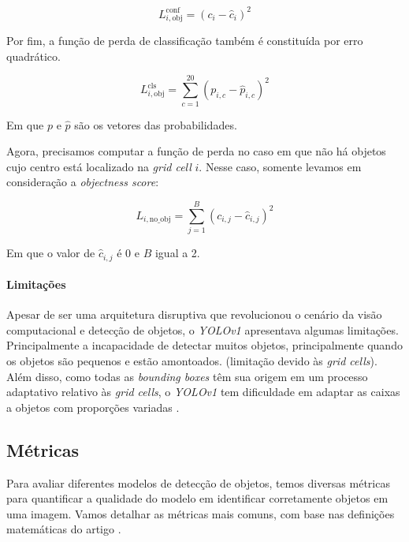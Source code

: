 \begin{center}
\[
L_{i, \text{obj}}^{\text{conf}} =  (c_i - \hat{c}_i)^2
\]
\end{center}

Por fim, a função de perda de classificação também é constituída por erro quadrático.

\begin{center}
\[
L_{i, \text{obj}}^{\text{cls}} = \sum_{c=1}^{20} (p_{i,c} - \hat{p}_{i,c})^2
\]
\end{center}

Em que $p$ e $\hat{p}$ são os vetores das probabilidades.

Agora, precisamos computar a função de perda no caso em que não há objetos cujo centro está localizado na \emph{grid cell} $i$. Nesse caso, somente levamos em consideração a \emph{objectness score}:

\begin{center}
\[
L_{i, \text{no\_obj}} = \sum_{j=1}^{B} (c_{i,j} - \hat{c}_{i,j})^2
\]
\end{center}

Em que o valor de $\hat{c}_{i,j}$ é 0 e $B$ igual a 2.

\paragraph{Limitações}
Apesar de ser uma arquitetura disruptiva que revolucionou o cenário da visão computacional e detecção de objetos, o \emph{YOLOv1} apresentava algumas limitações. Principalmente a incapacidade de detectar muitos objetos, principalmente quando os objetos são pequenos e estão amontoados. (limitação devido às \emph{grid cells}). Além disso, como todas as \emph{bounding boxes} têm sua origem em um processo adaptativo relativo às \emph{grid cells}, o \emph{YOLOv1} tem dificuldade em adaptar as caixas a objetos com proporções variadas \citep{yolo_review}.

\subsection{Métricas}
Para avaliar diferentes modelos de detecção de objetos, temos diversas métricas para quantificar a qualidade do modelo em identificar corretamente objetos em uma imagem. Vamos detalhar as métricas mais comuns, com base nas definições matemáticas do artigo \citep{Padilla2020A}.

